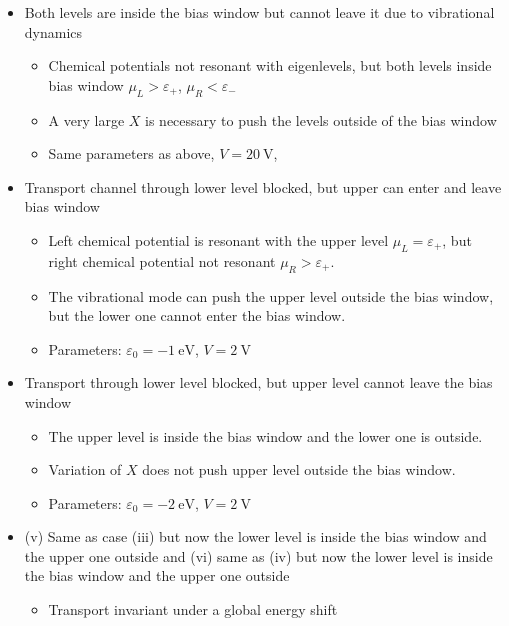 \documentclass{article}
\begin{document}
\begin{itemize}
\begin{itemize}
\begin{itemize}
			\item The levels can enter and leave the bias window as $X$ varies
			\item Same parameters as above, $V=2t_0 = \SI{4}{\volt}$
		\end{itemize}  
		\item[(ii)] Both levels are inside the bias window but cannot leave it due to vibrational dynamics
		\begin{itemize}
			\item Chemical potentials not resonant with eigenlevels, but both levels inside bias window $\mu_L>\varepsilon_+$, $\mu_R< \varepsilon_-$
			\item A very large $X$ is necessary to push the levels outside of the bias window
			\item Same parameters as above, $V=\SI{20}{\volt}$,
		\end{itemize}
		\item[(iii)] Transport channel through lower level blocked, but upper can enter and leave bias window
		\begin{itemize}
			\item Left chemical potential is resonant with the upper level $\mu_L=\varepsilon_+$, but right chemical potential not resonant $\mu_R>\varepsilon_+$. 
			\item The vibrational mode can push the upper level outside the bias window, but the lower one cannot enter the bias window.
			\item Parameters: $\varepsilon_0 = -\SI{1}{\electronvolt}$, $V=\SI{2}{\volt}$
		\end{itemize}
		\item[(iv)] Transport through lower level blocked, but upper level cannot leave the bias window 
		\begin{itemize}
			\item The upper level is inside the bias window and the lower one is outside.
			\item Variation of $X$ does not push upper level outside the bias window.
			\item Parameters: $\varepsilon_0 = -\SI{2}{\electronvolt}$, $V=\SI{2}{\volt}$
		\end{itemize}
		\item (v) Same as case (iii) but now the lower level is inside the bias window and the upper one outside and (vi) same as (iv) but now the lower level is inside the bias window and the upper one outside
		\begin{itemize}
			\item Transport invariant under a global energy shift

\end{itemize}
\end{itemize}
\end{itemize}
\end{document}

